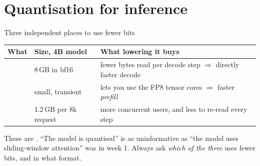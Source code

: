 \documentclass[aspectratio=169,10pt]{beamer}
\begin{document}
\section{Quantisation for inference}

\begin{frame}{Three independent places to use fewer bits}
  \centering
  \begin{tabular}{@{}L{2.4cm} L{3.6cm} L{5.2cm}@{}}
    \toprule
    \textbf{What} & \textbf{Size, 4B model} & \textbf{What lowering it buys}\\
    \midrule
     & 8\,GB in bf16 &
      fewer bytes read per decode step $\Rightarrow$ directly faster decode\\[0.3em]
     & small, transient &
      lets you use the FP8 tensor cores $\Rightarrow$ faster \emph{prefill}\\[0.3em]
     & 1.2\,GB per 8k request &
      more concurrent users, and less to re-read every step\\
    \bottomrule
  \end{tabular}

  \vspace{0.4em}
  \raggedright
  These are . ``The model is quantised'' is as
  uninformative as ``the model uses sliding-window attention'' was in week 1.
  Always ask \emph{which of the three} uses fewer bits, and in what format.
\end{frame}
\end{document}
